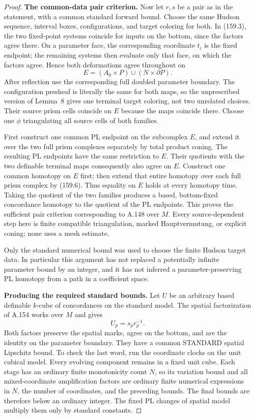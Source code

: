 \begin{proof}
\textbf{The common-data pair criterion.}\quad
Now let $r,s$ be a pair as in the statement, with a common
standard forward bound. Choose the same Hudson sequence,
interval boxes, configurations, and target coloring for both.
In (159.3), the two fixed-point systems coincide for inputs
on the bottom, since the factors agree there. On a parameter
face, the corresponding coordinate $t_i$ is the fixed endpoint;
the remaining systems then evaluate only that face, on which
the factors agree. Hence both deformations agree throughout on
\[
 E=(A_0\times P)\cup(N\times\partial P).
 \tag{159.7}
\]
After reflection use the corresponding full doubled parameter
boundary. The configuration presheaf is literally the same
for both maps, so the unprescribed version of Lemma~8 gives
one terminal target coloring, not two unrelated choices.
Their source prism cells coincide on $E$ because the maps
coincide there. Choose one $\phi$ triangulating all source
cells of both families.

First construct one common PL endpoint on the subcomplex
$E$, and extend it over the two full prism complexes
separately by total product coning. The resulting PL
endpoints have the same restriction to $E$. Their quotients
with the two definable terminal maps consequently also
agree on $E$. Construct one common homotopy on $E$ first;
then extend that entire homotopy over each full prism complex
by (159.6). Thus equality on $E$ holds at every homotopy time.
Taking the quotient of the two families produces a based,
bottom-fixed concordance homotopy to the quotient of the
PL endpoints. This proves the sufficient pair criterion
corresponding to A.148 over $M$. Every source-dependent step
here is finite compatible triangulation, marked
Hauptvermutung, or explicit coning; none uses a mesh estimate.

Only the standard numerical bound was used to choose the
finite Hudson target data. In particular this argument has
not replaced a potentially infinite parameter bound by an
integer, and it has not inferred a parameter-preserving PL
homotopy from a path in a coefficient space.


\textbf{Producing the required standard bounds.}\quad
Let $U$ be an arbitrary based definable $k$-cube of concordances
on the standard model. The spatial factorization of A.154
works over $M$ and gives
\[
 U_p=s_pr_p^{-1}.
 \tag{159.8}
\]
Both factors preserve the spatial marks, agree on the bottom,
and are the identity on the parameter boundary. They have a
common STANDARD spatial Lipschitz bound. To check the last
word, run the coordinate clocks on the unit cubical model.
Every evolving component remains in a fixed unit cube. Each
stage has an ordinary finite monotonicity count $N$, so its
variation bound and all mixed-coordinate amplification factors
are ordinary finite numerical expressions in $N$, the number
of coordinates, and the preceding bounds. The final bounds
are therefore below an ordinary integer. The fixed PL changes
of spatial model multiply them only by standard constants.


\end{proof}

